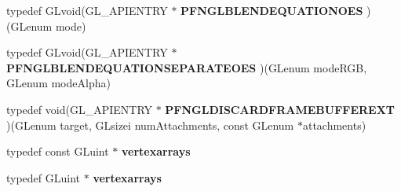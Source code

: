 \begin{DoxyCompactItemize}
\item 
\hypertarget{class_c_p_v_r_tgles_ext_aefb31c7aff49c747518c2b526cc1a192}{typedef G\+Lvoid(G\+L\+\_\+\+A\+P\+I\+E\+N\+T\+R\+Y $\ast$ {\bfseries P\+F\+N\+G\+L\+B\+L\+E\+N\+D\+E\+Q\+U\+A\+T\+I\+O\+N\+O\+E\+S} )(G\+Lenum mode)}\label{class_c_p_v_r_tgles_ext_aefb31c7aff49c747518c2b526cc1a192}

\item 
\hypertarget{class_c_p_v_r_tgles_ext_a8c9570e5c797cdc3002c91b5ff3ace49}{typedef G\+Lvoid(G\+L\+\_\+\+A\+P\+I\+E\+N\+T\+R\+Y $\ast$ {\bfseries P\+F\+N\+G\+L\+B\+L\+E\+N\+D\+E\+Q\+U\+A\+T\+I\+O\+N\+S\+E\+P\+A\+R\+A\+T\+E\+O\+E\+S} )(G\+Lenum mode\+R\+G\+B, G\+Lenum mode\+Alpha)}\label{class_c_p_v_r_tgles_ext_a8c9570e5c797cdc3002c91b5ff3ace49}

\item 
\hypertarget{class_c_p_v_r_tgles_ext_a300f70ffc482e4856d73d44be8c851a4}{typedef void(G\+L\+\_\+\+A\+P\+I\+E\+N\+T\+R\+Y $\ast$ {\bfseries P\+F\+N\+G\+L\+D\+I\+S\+C\+A\+R\+D\+F\+R\+A\+M\+E\+B\+U\+F\+F\+E\+R\+E\+X\+T} )(G\+Lenum target, G\+Lsizei num\+Attachments, const G\+Lenum $\ast$attachments)}\label{class_c_p_v_r_tgles_ext_a300f70ffc482e4856d73d44be8c851a4}

\item 
\hypertarget{class_c_p_v_r_tgles_ext_a93ced4362eda687739b3e0d4e880137c}{typedef const G\+Luint $\ast$ {\bfseries vertexarrays}}\label{class_c_p_v_r_tgles_ext_a93ced4362eda687739b3e0d4e880137c}

\item 
\hypertarget{class_c_p_v_r_tgles_ext_adff6e99466d474e203e719485d2ccda1}{typedef G\+Luint $\ast$ {\bfseries vertexarrays}}\label{class_c_p_v_r_tgles_ext_adff6e99466d474e203e719485d2ccda1}

\end{DoxyCompactItemize}
